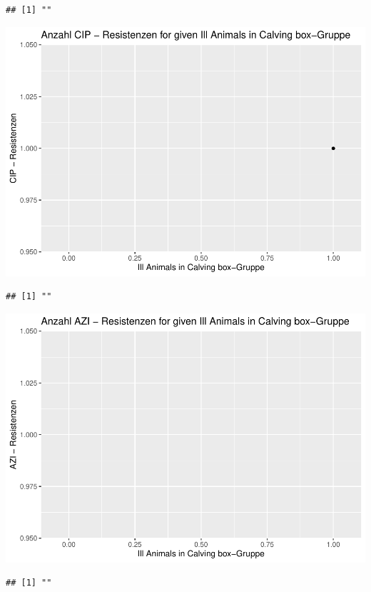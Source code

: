 \documentclass[
]{article}
\begin{document}
\begin{verbatim}
## [1] ""
\end{verbatim}

\includegraphics{NResistenzen_files/figure-latex/binary_or_nominal_variables-22.pdf}

\begin{verbatim}
## [1] ""
\end{verbatim}

\includegraphics{NResistenzen_files/figure-latex/binary_or_nominal_variables-23.pdf}

\begin{verbatim}
## [1] ""
\end{verbatim}
\end{document}

